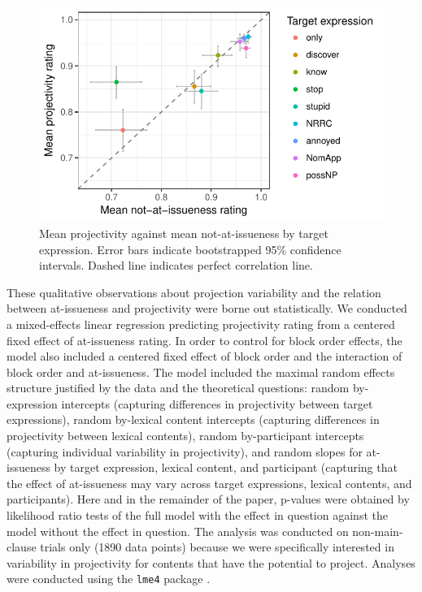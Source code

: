 \documentclass[11pt,fleqn]{article}
\newcommand{\6}{\mbox{$[\hspace*{-.6mm}[$}}
\newcommand{\9}{\mbox{$]\hspace*{-.6mm}]$}}
\begin{document}
\begin{figure}[!h]

\begin{center}
\includegraphics[width=12cm]{../results/exp1a/graphs/ai-proj-bytrigger}
\end{center}

\caption{Mean projectivity against mean not-at-issueness by target expression. Error bars indicate bootstrapped 95\% confidence intervals. Dashed line indicates perfect correlation line.}
\label{fig:f-proj-ai-1a}
\end{figure}

These qualitative observations about projection variability and the relation between at-issueness and projectivity were borne out statistically. We conducted a mixed-effects linear regression predicting projectivity rating from a centered fixed effect of at-issueness rating. In order to control for block order effects, the model also included a centered fixed effect of block order and the interaction of block order and at-issueness. The model included the maximal random effects structure justified by the data and the theoretical questions: random by-expression intercepts (capturing differences in projectivity between target expressions),  random by-lexical content intercepts (capturing differences in projectivity between lexical contents), random by-participant intercepts (capturing individual variability in projectivity), and random slopes for at-issueness by target expression, lexical content, and participant (capturing that the effect of at-issueness may vary across target expressions, lexical contents, and participants). Here and in the remainder of the paper, p-values were obtained by likelihood ratio tests of the full model with the effect in question against the model without the effect in question. The analysis was conducted on non-main-clause trials only (1890 data points) because we were specifically interested in variability in projectivity for contents that have the potential to project. Analyses were conducted using the \verb|lme4| package \citep{bates2015}.
\end{document}
